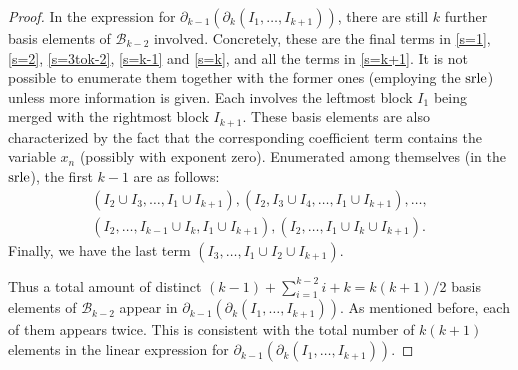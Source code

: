 \documentclass[ALCO]{cedram}
\newcommand{\mcb}{\mbox{$\mathcal{B}$}}
\newcommand{\dif}{\mbox{$\partial$}}
\newcommand{\srle}{\mbox{${\rm srle}$}}
\begin{document}
\begin{proof}
In the expression for $\dif_{k-1}(\dif_{k}(I_1,\ldots,I_{k+1}))$,
there are still $k$ further basis elements of $\mcb_{k-2}$
involved. Concretely, these are the final terms in \eqref{s=1},
\eqref{s=2}, \eqref{s=3tok-2}, \eqref{s=k-1} and \eqref{s=k}, and all
the terms in \eqref{s=k+1}. It is not possible to enumerate them
together with the former ones (employing the $\srle$) unless more
information is given. Each involves the leftmost block $I_1$ being
merged with the rightmost block $I_{k+1}$. These basis elements are
also characterized by the fact that the corresponding coefficient term
contains the variable $x_n$ (possibly with exponent zero). Enumerated
among themselves (in the $\srle$), the first $k-1$ are as follows:
\begin{multline*}
(I_2\cup I_3,\ldots ,I_1\cup I_{k+1}),(I_2,I_3\cup I_4,\ldots ,I_1\cup
  I_{k+1}),\ldots ,\\(I_2,\ldots ,I_{k-1}\cup I_k,I_1\cup I_{k+1}),
  (I_2,\ldots ,I_1\cup I_k\cup I_{k+1}).
\end{multline*}
Finally, we have the last term $(I_3,\ldots ,I_1\cup I_2\cup
I_{k+1})$.

Thus a total amount of distinct $(k-1)+\sum_{i=1}^{k-2}i+k=k(k+1)/2$
basis elements of $\mcb_{k-2}$ appear in
$\dif_{k-1}(\dif_{k}(I_1,\ldots,I_{k+1}))$. As mentioned before, each
of them appears twice. This is consistent with the total number of
$k(k+1)$ elements in the linear expression for
$\dif_{k-1}(\dif_{k}(I_1,\ldots,I_{k+1}))$.


\end{proof}
\end{document}
